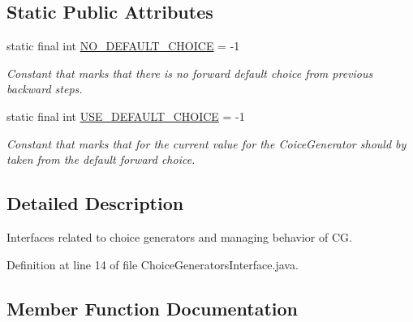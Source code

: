 \subsection*{Static Public Attributes}
\begin{DoxyCompactItemize}
\item 
static final int \hyperlink{interfacegov_1_1nasa_1_1jpf_1_1inspector_1_1interfaces_1_1_choice_generators_interface_a96ec402a57d2b3547337e677e23075cd}{N\+O\+\_\+\+D\+E\+F\+A\+U\+L\+T\+\_\+\+C\+H\+O\+I\+CE} = -\/1
\begin{DoxyCompactList}\small\item\em Constant that marks that there is no forward default choice from previous backward steps. \end{DoxyCompactList}\item 
static final int \hyperlink{interfacegov_1_1nasa_1_1jpf_1_1inspector_1_1interfaces_1_1_choice_generators_interface_ac57a2bb0eb101be2c2b27bd19cb81ea7}{U\+S\+E\+\_\+\+D\+E\+F\+A\+U\+L\+T\+\_\+\+C\+H\+O\+I\+CE} = -\/1
\begin{DoxyCompactList}\small\item\em Constant that marks that for the current value for the Coice\+Generator should by taken from the default forward choice. \end{DoxyCompactList}\end{DoxyCompactItemize}


\subsection{Detailed Description}
Interfaces related to choice generators and managing behavior of CG. 



Definition at line 14 of file Choice\+Generators\+Interface.\+java.



\subsection{Member Function Documentation}
